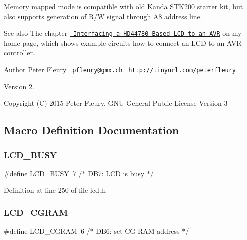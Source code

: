 Memory mapped mode is compatible with old Kanda S\+T\+K200 starter kit, but also supports generation of R/W signal through A8 address line.

\begin{DoxySeeAlso}{See also}
The chapter \href{ http://homepage.hispeed.ch/peterfleury/avr-lcd44780.html}{\texttt{ Interfacing a H\+D44780 Based L\+CD to an A\+VR}} on my home page, which shows example circuits how to connect an L\+CD to an A\+VR controller.
\end{DoxySeeAlso}
\begin{DoxyAuthor}{Author}
Peter Fleury \href{mailto:pfleury@gmx.ch}{\texttt{ pfleury@gmx.\+ch}} \href{http://tinyurl.com/peterfleury}{\texttt{ http\+://tinyurl.\+com/peterfleury}}
\end{DoxyAuthor}
\begin{DoxyVersion}{Version}
2.
\end{DoxyVersion}
\begin{DoxyCopyright}{Copyright}
(C) 2015 Peter Fleury, G\+NU General Public License Version 3 
\end{DoxyCopyright}


\subsection{Macro Definition Documentation}
\mbox{\label{group__pfleury__lcd_gac8dd1658e235f174d1cabae5c438943d}} 
\subsubsection{\texorpdfstring{LCD\_BUSY}{LCD\_BUSY}}
{\footnotesize\ttfamily \#define L\+C\+D\+\_\+\+B\+U\+SY~7      /$\ast$ D\+B7\+: L\+CD is busy                    $\ast$/}



Definition at line 250 of file lcd.\+h.

\mbox{\label{group__pfleury__lcd_ga3b38de74c362be1781fef1136aa9684c}} 
\subsubsection{\texorpdfstring{LCD\_CGRAM}{LCD\_CGRAM}}
{\footnotesize\ttfamily \#define L\+C\+D\+\_\+\+C\+G\+R\+AM~6      /$\ast$ D\+B6\+: set CG R\+AM address             $\ast$/}



